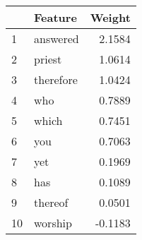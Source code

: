 \begin{tabular}{llr}
\toprule
{} &    Feature &  Weight \\
\midrule
1  &   answered &  2.1584 \\
2  &     priest &  1.0614 \\
3  &  therefore &  1.0424 \\
4  &        who &  0.7889 \\
5  &      which &  0.7451 \\
6  &        you &  0.7063 \\
7  &        yet &  0.1969 \\
8  &        has &  0.1089 \\
9  &    thereof &  0.0501 \\
10 &    worship & -0.1183 \\
\bottomrule
\end{tabular}
